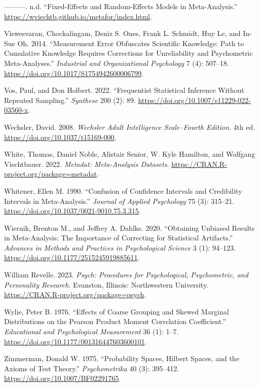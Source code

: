 \documentclass[
  letterpaper,
  DIV=11,
  numbers=noendperiod]{scrreprt}
\newlength{\cslhangindent}
\newenvironment{CSLReferences}[2] %
 {\begin{list}{}{%
  \setlength{\itemindent}{0pt}
  \setlength{\leftmargin}{0pt}
  \setlength{\parsep}{0pt}
  \ifodd #1
   \setlength{\leftmargin}{\cslhangindent}
   \setlength{\itemindent}{-1\cslhangindent}
  \fi
  \setlength{\itemsep}{#2\baselineskip}}}
 {\end{list}}
\begin{document}
\begin{CSLReferences}{1}{0}
---------. n.d. {``Fixed-Effects and Random-Effects Models in
Meta-Analysis.''} \url{https://wviechtb.github.io/metafor/index.html}.

Viswesvaran, Chockalingam, Deniz S. Ones, Frank L. Schmidt, Huy Le, and
In-Sue Oh. 2014. {``Measurement Error Obfuscates Scientific Knowledge:
Path to Cumulative Knowledge Requires Corrections for Unreliability and
Psychometric Meta-Analyses.''} \emph{Industrial and Organizational
Psychology} 7 (4): 507--18.
\url{https://doi.org/10.1017/S1754942600006799}.

Vos, Paul, and Don Holbert. 2022. {``Frequentist Statistical Inference
Without Repeated Sampling.''} \emph{Synthese} 200 (2): 89.
\url{https://doi.org/10.1007/s11229-022-03560-x}.

Wechsler, David. 2008. \emph{Wechsler Adult Intelligence Scale--Fourth
Edition}. 4th ed. \url{https://doi.org/10.1037/t15169-000}.

White, Thomas, Daniel Noble, Alistair Senior, W. Kyle Hamilton, and
Wolfgang Viechtbauer. 2022. \emph{Metadat: Meta-Analysis Datasets}.
\url{https://CRAN.R-project.org/package=metadat}.

Whitener, Ellen M. 1990. {``Confusion of Confidence Intervals and
Credibility Intervals in Meta-Analysis.''} \emph{Journal of Applied
Psychology} 75 (3): 315--21.
\url{https://doi.org/10.1037/0021-9010.75.3.315}.

Wiernik, Brenton M., and Jeffrey A. Dahlke. 2020. {``Obtaining Unbiased
Results in Meta-Analysis: The Importance of Correcting for Statistical
Artifacts.''} \emph{Advances in Methods and Practices in Psychological
Science} 3 (1): 94--123. \url{https://doi.org/10.1177/2515245919885611}.

William Revelle. 2023. \emph{Psych: Procedures for Psychological,
Psychometric, and Personality Research}. Evanston, Illinois:
Northwestern University. \url{https://CRAN.R-project.org/package=psych}.

Wylie, Peter B. 1976. {``Effects of Coarse Grouping and Skewed Marginal
Distributions on the Pearson Product Moment Correlation Coefficient.''}
\emph{Educational and Psychological Measurement} 36 (1): 1--7.
\url{https://doi.org/10.1177/001316447603600101}.

Zimmerman, Donald W. 1975. {``Probability Spaces, Hilbert Spaces, and
the Axioms of Test Theory.''} \emph{Psychometrika} 40 (3): 395--412.
\url{https://doi.org/10.1007/BF02291765}.

\end{CSLReferences}
\end{document}

